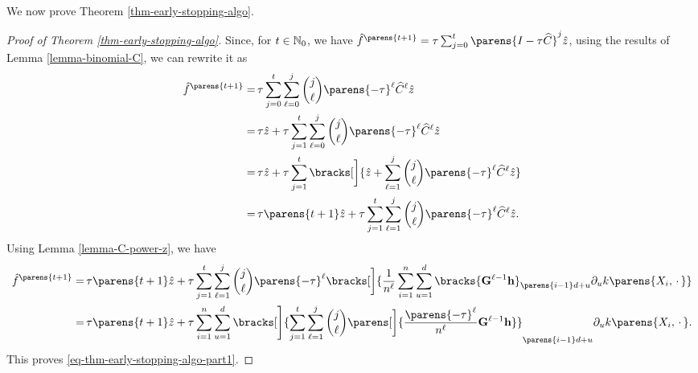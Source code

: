 We now prove Theorem \ref{thm-early-stopping-algo}. 

\begin{proof}[Proof of Theorem \ref{thm-early-stopping-algo}]
	Since, for $t \in \mathbb{N}_0$, we have $\hat{f}^{\parens{t+1}} = \tau \sum_{j=0}^t \parens{I - \tau \widehat{C}}^{j} \hat{z}$, using the results of Lemma \ref{lemma-binomial-C}, we can rewrite it as 
	\begin{align*}
		\hat{f}^{\parens{t+1}} = & \, \tau \sum_{j=0}^t \sum_{\ell=0}^j {j \choose \ell} \parens{-\tau}^{\ell} \widehat{C}^{\ell} \hat{z} \nonumber \\ 
		= & \, \tau \hat{z} + \tau \sum_{j=1}^t \sum_{\ell=0}^j {j \choose \ell} \parens{-\tau}^{\ell} \widehat{C}^{\ell} \hat{z} \nonumber \\ 
		= & \, \tau \hat{z} + \tau \sum_{j=1}^t \bracks[\bigg]{\hat{z} + \sum_{\ell=1}^j {j \choose \ell} \parens{-\tau}^{\ell} \widehat{C}^{\ell} \hat{z}} \nonumber \\ 
		= & \, \tau \parens{t + 1} \hat{z} + \tau \sum_{j=1}^t \sum_{\ell=1}^j {j \choose \ell} \parens{-\tau}^{\ell} \widehat{C}^{\ell} \hat{z}. %
	\end{align*}
	Using Lemma \ref{lemma-C-power-z}, we have 
	\begin{align*}
		\hat{f}^{\parens{t+1}} = & \, \tau \parens{t + 1} \hat{z} + \tau \sum_{j=1}^t \sum_{\ell=1}^j {j \choose \ell} \parens{-\tau}^{\ell} \bracks[\bigg]{\frac{1}{n^{\ell}} \sum_{i=1}^n \sum_{u=1}^d \bracks{\bG^{\ell-1} \bh}_{\parens{i-1}d+u} \partial_u k \parens{X_i, \,\cdot\,}} \nonumber \\ 
		= & \, \tau \parens{t + 1} \hat{z} + \tau \sum_{i=1}^n \sum_{u=1}^d \bracks[\Bigg]{\sum_{j=1}^t \sum_{\ell=1}^j {j \choose \ell} \parens[\bigg]{\frac{\parens{-\tau}^{\ell}}{n^{\ell}} \bG^{\ell-1} \bh}}_{\parens{i-1}d+u} \partial_u k \parens{X_i, \,\cdot\,}. 
	\end{align*}
	This proves \eqref{eq-thm-early-stopping-algo-part1}. 
	

\end{proof}
